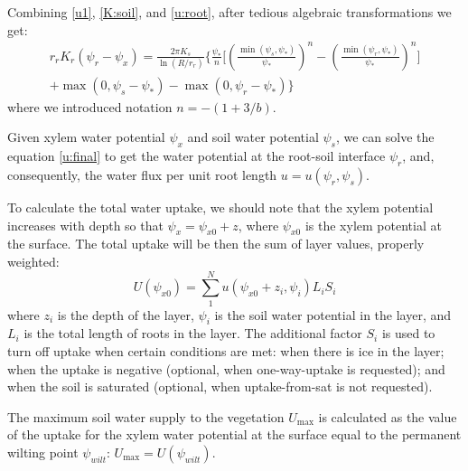 \documentclass{article}
\newcommand{\psisat}{\psi_*}%
\begin{document}
Combining \eqref{u1}, \eqref{K:soil}, and \eqref{u:root}, after tedious algebraic
transformations we get:
\begin{multline}\label{u:final}
   r_r K_r(\psi_r - \psi_x)=\frac{2 \pi K_s}{\ln(R/r_r)}\Bigg\{
        \frac{\psisat}{n} \bigg[
           \left(\frac{\min(\psi_s,\psisat)}{\psisat}\right)^n -
           \left(\frac{\min(\psi_r,\psisat)}{\psisat}\right)^n 
        \bigg]\\
      +\max(0,\psi_s-\psisat) - \max(0,\psi_r-\psisat)
   \Bigg\}
\end{multline}
%
where we introduced notation $n=-(1+3/b)$.

Given xylem water potential $\psi_x$ and soil water potential $\psi_s$, we can
solve the equation \eqref{u:final} to get the water potential  at the root-soil
interface $\psi_r$, and, consequently, the water flux per unit root length
$u=u(\psi_r,\psi_s)$. 

To calculate the total water uptake, we should note that the xylem potential
increases with depth so that $\psi_x = \psi_{x0}+z$, where $\psi_{x0}$ is the 
xylem potential at the surface. 
The total uptake will be then the sum of layer values, properly weighted:
\begin{equation}\label{u:total}
   U(\psi_{x0}) = \sum_{1}^{N} u(\psi_{x0}+z_i, \psi_i) L_i S_i
\end{equation}
where $z_i$ is the depth of the 
layer, $\psi_i$ is the soil water potential in the layer, and $L_i$ is the total 
length of roots in the layer. The additional factor $S_i$ is used to turn off uptake
when certain conditions are met: when there is ice in the layer; when
the uptake is negative (optional, when one-way-uptake is requested); and when
the soil is saturated (optional, when uptake-from-sat is not requested).

The maximum soil water supply to the vegetation $U_{\max}$ is calculated as the value 
of the uptake for the xylem water potential at the surface equal to the permanent 
wilting point $\psi_{wilt}$: $U_{\max}=U(\psi_{wilt})$.



\end{document}
